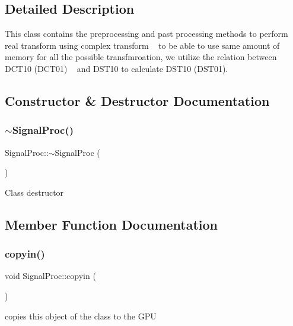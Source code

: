 \subsection{Detailed Description}
This class contains the preprocessing and past processing methods to perform real transform using complex transform ~\newline
 to be able to use same amount of memory for all the possible transfmroation, we utilize the relation between D\+C\+T10 (D\+C\+T01) ~\newline
 and D\+S\+T10 to calculate D\+S\+T10 (D\+S\+T01). 

\subsection{Constructor \& Destructor Documentation}
\mbox{\label{classSignalProc_a8a38a90716c66a1e634135f4e76d434b}} 
\subsubsection{\texorpdfstring{$\sim$\+Signal\+Proc()}{~SignalProc()}}
{\footnotesize\ttfamily Signal\+Proc\+::$\sim$\+Signal\+Proc (\begin{DoxyParamCaption}{ }\end{DoxyParamCaption})}

Class destructor 

\subsection{Member Function Documentation}
\mbox{\label{classSignalProc_a8cd947bf0b29450012a8ec2939cf8cdc}} 
\subsubsection{\texorpdfstring{copyin()}{copyin()}}
{\footnotesize\ttfamily void Signal\+Proc\+::copyin (\begin{DoxyParamCaption}{ }\end{DoxyParamCaption})}

copies \textquotesingle{}this\textquotesingle{} object of the class to the G\+PU \mbox{\label{classSignalProc_af9130e26afc367410205f564ee69d8df}} 
